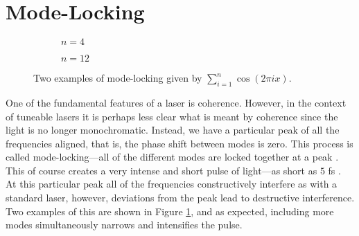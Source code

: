 \section{Mode-Locking}
\begin{figure}[tbp]
\centering
\begin{subfigure}{0.5\textwidth}

\caption{$n = 4$}
\end{subfigure}%
\begin{subfigure}{0.5\textwidth}

\caption{$n = 12$}
\end{subfigure}
\caption[Two examples of mode-locking.]{Two examples of mode-locking given by $\displaystyle \sum_{i = 1}^n \cos \left( 2 \pi i x \right)$.}
\label{fig:ml}
\end{figure}
One of the fundamental features of a laser is coherence. However, in the context of tuneable lasers it is perhaps less clear what is meant by coherence since the light is no longer monochromatic. Instead, we have a particular peak of all the frequencies aligned, that is, the phase shift between modes is zero. This process is called mode-locking---all of the different modes are locked together at a peak \cite{agrawal2013, hausbook, silfvast}. This of course creates a very intense and short pulse of light---as short as $5$ fs \cite{silfvast}. At this particular peak all of the frequencies constructively interfere as with a standard laser, however, deviations from the peak lead to destructive interference. Two examples of this are shown in Figure \ref{fig:ml}, and as expected, including more modes simultaneously narrows and intensifies the pulse. \\


